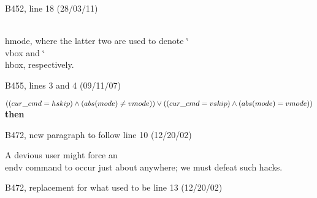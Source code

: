 {{\bugonpage B452, line 18 (28/03/11)

\noindent\\{hmode}, where the latter two are used to denote
 \.{\char`\\vbox} and \.{\char`\\hbox}, respectively.

\bugonpage B455, lines 3 and 4 (09/11/07)

\ninepoint\noindent
{} $((\\{cur\_cmd}=\\{hskip})\land(\\{abs}(\\{mode})\ne\\{vmode}))
 \lor  ((\\{cur\_cmd}=\\{vskip})\land(\\{abs}(\\{mode})=\\{vmode}))$ {\bf then}

\bugonpage B472, new paragraph to follow line 10 (12/20/02)

\tenpoint\noindent\quad
A devious user might force an \\{endv} command to occur just about anywhere;
we must defeat such hacks.

\bugonpage B472, replacement for what used to be line 13 (12/20/02)

}}
